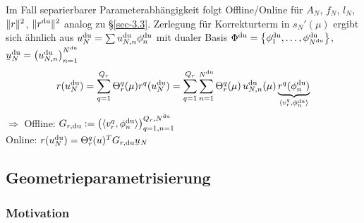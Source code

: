 \begin{bem}
	Im Fall separierbarer Parameterabhängigkeit folgt Offline/Online für $A_N$, $f_N$, $l_N$, $\|r\|^2$, $\|r^{\mathrm{du}}\|^2$ analog zu §\ref{sec-3.3}.
	Zerlegung für Korrekturterm in $s_N'(\mu)$ ergibt sich ähnlich aus $u_N^\du = \sum u_{N,n}^\du \phi_n^\du$ mit dualer Basis $\Phi^\du = \set{\phi_1^\du,\ldots,\phi_{N^\du}^\du}$, $\ubar u_N^\du = \seq{u_{N,n}^\du}_{n=1}^{N^\du}$
	\[
		r(u_N^\du) = \sum_{q=1}^{Q_r} \Theta_r^q(\mu) r^q(u_N^\du) = \sum_{q=1}^{Q_r} \sum_{n=1}^{N^\du} \Theta_r^q(\mu) \, u_{N,n}^\du(\mu) \underbrace{r^q(\phi_n^\du)}_{\dotp{v_r^q}{\phi_n^\du}}
	\]
	$\Rightarrow$ Offline: $G_{r,\du} := \seq{\dotp{v_r^q}{\phi_n^\du}}_{q=1,n=1}^{Q_r,N^\du}$\\
	Online: $r(u_N^\du) = \Theta_r^q(u)^T G_{r,\du} \ubar u_N$
\end{bem}

\subsection{Geometrieparametrisierung}

\subsubsection*{Motivation}

